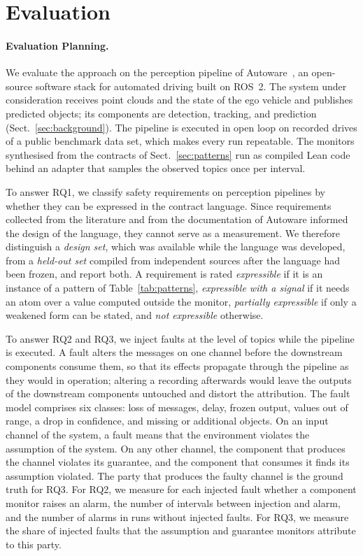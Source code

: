 \section{Evaluation}\label{sec:evaluation}

\paragraph{Evaluation Planning.} We evaluate the approach on the perception pipeline of Autoware~\cite{Kato2018}, an open-source software stack for automated driving built on ROS~2. The system under consideration receives point clouds and the state of the ego vehicle and publishes predicted objects; its components are detection, tracking, and prediction (Sect.~\ref{sec:background}). The pipeline is executed in open loop on recorded drives of a public benchmark data set, which makes every run repeatable.  The monitors synthesised from the contracts of Sect.~\ref{sec:patterns} run as compiled Lean code behind an adapter that samples the observed topics once per interval.

To answer RQ1, we classify safety requirements on perception pipelines by whether they can be expressed in the contract language. Since requirements collected from the literature and from the documentation of Autoware informed the design of the language, they cannot serve as a measurement. We therefore distinguish a \emph{design set}, which was available while the language was developed, from a \emph{held-out set} compiled from independent sources after the language had been frozen, and report both. A requirement is rated \emph{expressible} if it is an instance of a pattern of Table~\ref{tab:patterns}, \emph{expressible with a signal} if it needs an atom over a value computed outside the monitor, \emph{partially expressible} if only a weakened form can be stated, and \emph{not expressible} otherwise.

To answer RQ2 and RQ3, we inject faults at the level of topics while the pipeline is executed. A fault alters the messages on one channel before the downstream components consume them, so that its effects propagate through the pipeline as they would in operation; altering a recording afterwards would leave the outputs of the downstream components untouched and distort the attribution. The fault model comprises six classes: loss of messages, delay, frozen output, values out of range, a drop in confidence, and missing or additional objects. On an input channel of the system, a fault means that the environment violates the assumption of the system. On any other channel, the component that produces the channel violates its guarantee, and the component that consumes it finds its assumption violated. The party that produces the faulty channel is the ground truth for RQ3. For RQ2, we measure for each injected fault whether a component monitor raises an alarm, the number of intervals between injection and alarm, and the number of alarms in runs without injected faults. For RQ3, we measure the share of injected faults that the assumption and guarantee monitors attribute to this party.

